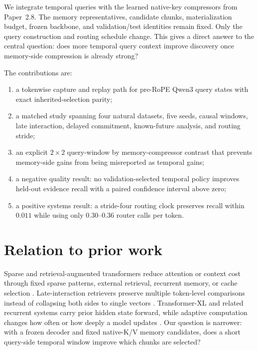 \documentclass[11pt]{article}
\newcommand{\paperii}{Paper~2.8}
\begin{document}
We integrate temporal queries with the learned native-key compressors from \paperii. The memory representatives, candidate chunks, materialization budget, frozen backbone, and validation/test identities remain fixed. Only the query construction and routing schedule change. This gives a direct answer to the central question: does more temporal query context improve discovery once memory-side compression is already strong?

The contributions are:
\begin{enumerate}[leftmargin=*]
\item a tokenwise capture and replay path for pre-RoPE Qwen3 query states with exact inherited-selection parity;
\item a matched study spanning four natural datasets, five seeds, causal windows, late interaction, delayed commitment, known-future analysis, and routing stride;
\item an explicit $2\times2$ query-window by memory-compressor contrast that prevents memory-side gains from being misreported as temporal gains;
\item a negative quality result: no validation-selected temporal policy improves held-out evidence recall with a paired confidence interval above zero;
\item a positive systems result: a stride-four routing clock preserves recall within $0.011$ while using only $0.30$--$0.36$ router calls per token.
\end{enumerate}

\section{Relation to prior work}
Sparse and retrieval-augmented transformers reduce attention or context cost through fixed sparse patterns, external retrieval, recurrent memory, or cache selection \cite{beltagy2020longformer,zaheer2020bigbird,lewis2020rag,borgeaud2022retro,rae2020compressive,li2024snapkv}. Late-interaction retrievers preserve multiple token-level comparisons instead of collapsing both sides to single vectors \cite{khattab2020colbert}. Transformer-XL and related recurrent systems carry prior hidden state forward, while adaptive computation changes how often or how deeply a model updates \cite{dai2019transformerxl,graves2016adaptive}. Our question is narrower: with a frozen decoder and fixed native-K/V memory candidates, does a short query-side temporal window improve which chunks are selected?
\end{document}
